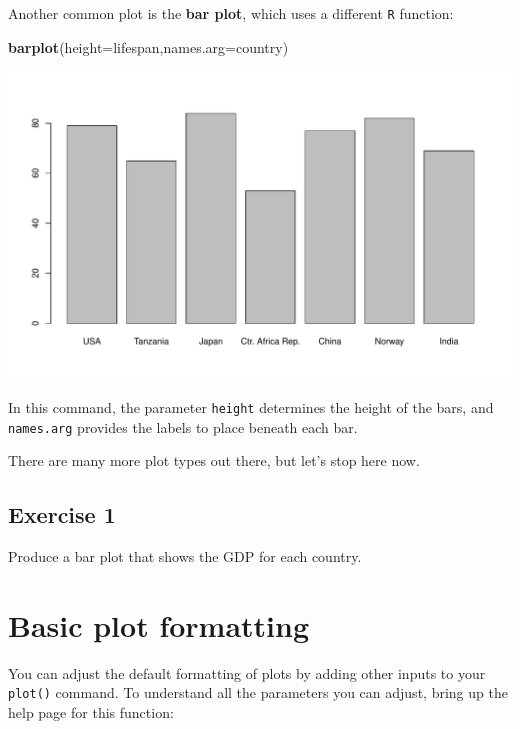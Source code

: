 \documentclass[
]{book}
\newenvironment{Shaded}{\begin{snugshade}}{\end{snugshade}}
\newcommand{\DataTypeTok}[1]{\textcolor[rgb]{0.13,0.29,0.53}{#1}}
\newcommand{\KeywordTok}[1]{\textcolor[rgb]{0.13,0.29,0.53}{\textbf{#1}}}
\newcommand{\NormalTok}[1]{#1}
\begin{document}
Another common plot is the \textbf{bar plot}, which uses a different \texttt{R} function:

\begin{Shaded}
\begin{Highlighting}[]
\KeywordTok{barplot}\NormalTok{(}\DataTypeTok{height=}\NormalTok{lifespan,}\DataTypeTok{names.arg=}\NormalTok{country)}
\end{Highlighting}
\end{Shaded}

\includegraphics{figures/unnamed-chunk-101-1.pdf}

In this command, the parameter \texttt{height} determines the height of the bars, and \texttt{names.arg} provides the labels to place beneath each bar.

There are many more plot types out there, but let's stop here now.

\hypertarget{exercise-1-4}{%
\subsection*{Exercise 1}\label{exercise-1-4}}

Produce a bar plot that shows the GDP for each country.

\hypertarget{basic-plot-formatting}{%
\section*{Basic plot formatting}\label{basic-plot-formatting}}

You can adjust the default formatting of plots by adding other inputs to your \texttt{plot()} command. To understand all the parameters you can adjust, bring up the help page for this function:
\end{document}
